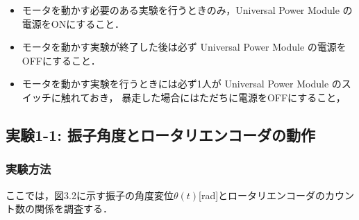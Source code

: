 \begin{itemize}
  \item モータを動かす必要のある実験を行うときのみ，Universal Power Module の電源をONにすること．
  \item モータを動かす実験が終了した後は必ず Universal Power Module の電源をOFFにすること．
  \item モータを動かす実験を行うときには必ず1人が Universal Power Module のスイッチに触れておき， 暴走した場合にはただちに電源をOFFにすること，
\end{itemize}

\subsection{実験1-1: 振子角度とロータリエンコーダの動作}

\subsubsection{実験方法}
\noindent
ここでは，図3.2に示す振子の角度変位\(\theta (t)\)[rad]とロータリエンコーダのカウント数の関係を調査する．

